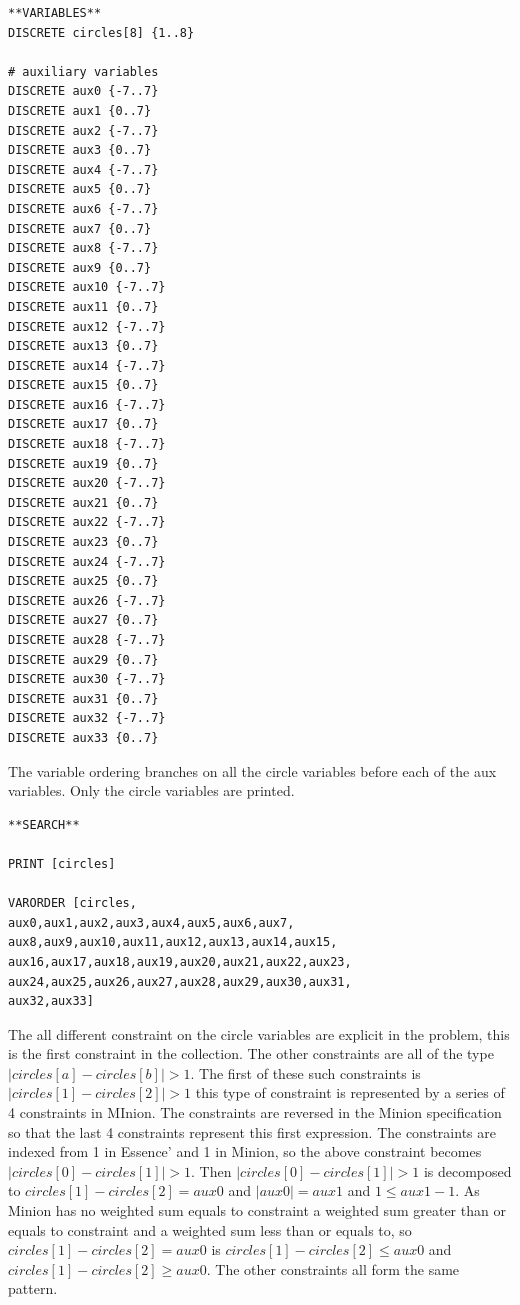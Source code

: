 \documentclass[oneside]{book}
\begin{document}
\begin{verbatim}
**VARIABLES**
DISCRETE circles[8] {1..8}

# auxiliary variables
DISCRETE aux0 {-7..7}
DISCRETE aux1 {0..7}
DISCRETE aux2 {-7..7}
DISCRETE aux3 {0..7}
DISCRETE aux4 {-7..7}
DISCRETE aux5 {0..7}
DISCRETE aux6 {-7..7}
DISCRETE aux7 {0..7}
DISCRETE aux8 {-7..7}
DISCRETE aux9 {0..7}
DISCRETE aux10 {-7..7}
DISCRETE aux11 {0..7}
DISCRETE aux12 {-7..7}
DISCRETE aux13 {0..7}
DISCRETE aux14 {-7..7}
DISCRETE aux15 {0..7}
DISCRETE aux16 {-7..7}
DISCRETE aux17 {0..7}
DISCRETE aux18 {-7..7}
DISCRETE aux19 {0..7}
DISCRETE aux20 {-7..7}
DISCRETE aux21 {0..7}
DISCRETE aux22 {-7..7}
DISCRETE aux23 {0..7}
DISCRETE aux24 {-7..7}
DISCRETE aux25 {0..7}
DISCRETE aux26 {-7..7}
DISCRETE aux27 {0..7}
DISCRETE aux28 {-7..7}
DISCRETE aux29 {0..7}
DISCRETE aux30 {-7..7}
DISCRETE aux31 {0..7}
DISCRETE aux32 {-7..7}
DISCRETE aux33 {0..7}
\end{verbatim}

The variable ordering branches on all the circle variables before each of the aux variables. Only the circle variables are printed.

\begin{verbatim}
**SEARCH**

PRINT [circles]

VARORDER [circles,
aux0,aux1,aux2,aux3,aux4,aux5,aux6,aux7,
aux8,aux9,aux10,aux11,aux12,aux13,aux14,aux15,
aux16,aux17,aux18,aux19,aux20,aux21,aux22,aux23,
aux24,aux25,aux26,aux27,aux28,aux29,aux30,aux31,
aux32,aux33]
\end{verbatim}

The all different constraint on the circle variables are explicit in the  problem, this is the first constraint in the collection. The other constraints are all of the type $|circles[a] - circles[b]| > 1$. The first of these such constraints is $|circles[1] - circles[2]| > 1$ this type of constraint is represented by a series of 4 constraints in MInion.   The constraints are reversed in the Minion specification so that the last 4 constraints represent this first expression. The constraints are indexed from 1 in Essence' and 1 in Minion, so the above constraint becomes $|circles[0] - circles[1]| > 1$. Then $|circles[0] - circles[1]| > 1$ is decomposed to $circles[1] - circles[2] = aux0$ and $|aux0| = aux1$ and $1 \leq aux1-1$.  As Minion has no weighted sum equals to constraint a weighted sum greater than or equals to constraint and a weighted sum less than or equals to, so $circles[1] - circles[2] = aux0$ is $circles[1] - circles[2] \leq aux0$ and $circles[1] - circles[2] \geq aux0$. The other constraints all form the same pattern.
\end{document}
